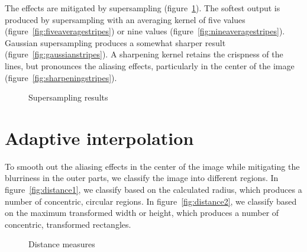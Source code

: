 \documentclass[english,12pt]{ifimaster}
\begin{document}
The effects are mitigated by supersampling
(figure~\ref{fig:supersamplingresults}). The softest output is
produced by supersampling with an averaging kernel of five values
(figure~\ref{fig:fiveaveragestripes}) or nine values
(figure~\ref{fig:nineaveragestripes}). Gaussian supersampling produces
a somewhat sharper result (figure~\ref{fig:gaussianstripes}). A
sharpening kernel retains the crispness of the lines, but pronounces
the aliasing effects, particularly in the center of the image
(figure~\ref{fig:sharpeningstripes}).

\begin{figure}
  \centering
  \quad{}

  \quad{}

  \caption{Supersampling results}
  \label{fig:supersamplingresults}
\end{figure}

\section{Adaptive interpolation}
\label{sec:adaptive}

To smooth out the aliasing effects in the center of the image while
mitigating the blurriness in the outer parts, we classify the image
into different regions. In figure~\ref{fig:distance1}, we classify
based on the calculated radius, which produces a number of concentric,
circular regions. In figure~\ref{fig:distance2}, we classify based on
the maximum transformed width or height, which produces a number of
concentric, transformed rectangles.

\begin{figure}
  \centering
  \quad{}

  \caption{Distance measures}
  \label{fig:distance}
\end{figure}
\end{document}
